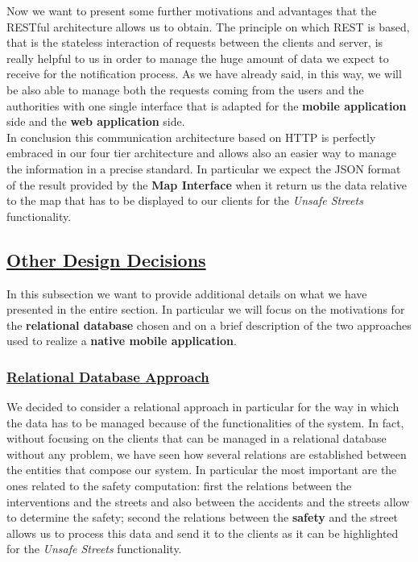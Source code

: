 			Now we want to present some further motivations and advantages that the RESTful architecture allows us to obtain. The principle on which REST is based, that is the stateless interaction of requests between the clients and server, is really helpful to us in order to manage the huge amount of data we expect to receive for the notification process. As we have already said, in this way, we will be also able to manage both the requests coming from the users and the authorities with one single interface that is adapted for the \textbf{mobile application} side and the \textbf{web application} side.\\
			
			In conclusion this communication architecture based on HTTP is perfectly embraced in our four tier architecture and allows also an easier way to manage the information in a precise standard. In particular we expect the JSON format of the result provided by the \textbf{Map Interface} when it return us the data relative to the map that has to be displayed to our clients for the \emph{Unsafe Streets} functionality.
	
	\subsection[Other Design Decisions]{\hyperlink{toc}{Other Design Decisions}}
		\label{sec:otherDesignDecisions}						
		
		In this subsection we want to provide additional details on what we have presented in the entire section. In particular we will focus on the motivations for the \textbf{relational database} chosen and on a brief description of the two approaches used to realize a \textbf{native mobile application}.
		
		\subsubsection[Relational Database Approach]{\hyperlink{toc}{Relational Database Approach}}
			\label{sec:relationaldbApproach}
			
			We decided to consider a relational approach in particular for the way in which the data has to be managed because of the functionalities of the system. In fact, without focusing on the clients that can be managed in a relational database without any problem, we have seen how several relations are established between the entities that compose our system. In particular the most important are the ones related to the safety computation: first the relations between the interventions and the streets and also between the accidents and the streets allow to determine the safety; second the relations between the \textbf{safety} and the street allows us to process this data and send it to the clients as it can be highlighted for the \emph{Unsafe Streets} functionality.\\
			
